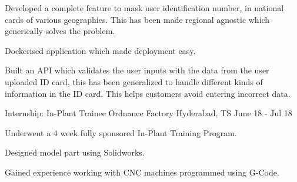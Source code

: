 \begin{cventries}
{\begin{cvitems}
        \item {Developed a complete feature to mask user identification number, in national cards of various geographies. This has been made regional agnostic which generically solves the problem.}
        \item {Dockerised application which made deployment easy.}
        \item {Built an API which validates the user inputs with the data from the user uploaded ID card, this has been generalized to handle different kinds of information in the ID card. This helps customers avoid entering incorrect data.}
      \end{cvitems}
    }
  \cventry
    {Internship: In-Plant Trainee}
    {Ordnance Factory}
    {Hyderabad, TS}
    {June 18 - Jul 18}
    {
      \begin{cvitems}
        \item {Underwent a 4 week fully sponsored In-Plant Training Program.}
        \item {Designed model part using Solidworks.}
        \item {Gained experience working with CNC machines programmed using G-Code.}
      \end{cvitems}
    }

\end{cventries}
